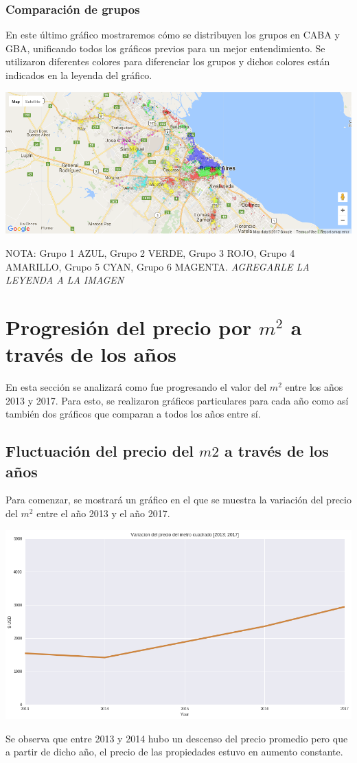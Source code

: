 \documentclass[a4paper, 10pt]{article}
\newcommand\tab[1][0.5cm]{\hspace*{#1}}
\begin{document}
				\subsubsection{Comparación de grupos}
					En este último gráfico mostraremos cómo se distribuyen los grupos en CABA y GBA, unificando todos los gráficos
					previos para un mejor entendimiento. Se utilizaron diferentes colores para diferenciar los grupos y dichos
					colores están indicados en la leyenda del gráfico.
					\begin{center}
						\includegraphics[width=\textwidth]{images/m2GroupComparison}
				  	\end{center}
				  	\tab NOTA: Grupo 1 AZUL, Grupo 2 VERDE, Grupo 3 ROJO, Grupo 4 AMARILLO, Grupo 5 CYAN, Grupo 6 MAGENTA.
				  	\emph{AGREGARLE LA LEYENDA A LA IMAGEN}
		\section{Progresión del precio por $m^2$ a través de los años}
			En esta sección se analizará como fue progresando el valor del $m^2$ entre los años 2013 y 2017. Para esto,
			se realizaron gráficos particulares para cada año como así también dos gráficos que comparan a todos los años entre sí.
			\subsection{Fluctuación del precio del $m2$ a través de los años}
				Para comenzar, se mostrará un gráfico en el que se muestra la variación del precio del $m^2$ entre el año 2013 y el 
				año 2017.
				\begin{center}
					\includegraphics[width=\textwidth]{images/m2ProgressionGeneral}
				\end{center}
				\tab Se observa que entre 2013 y 2014 hubo un descenso del precio promedio pero que a partir de dicho año, el precio
				de las propiedades estuvo en aumento constante.
\end{document}

